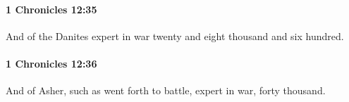 		\paragraph{1 Chronicles 12:35} %
			\label{1CHRONICLES-12-35}

			And of the Danites expert in war twenty and eight thousand and six hundred.


		\paragraph{1 Chronicles 12:36} %
			\label{1CHRONICLES-12-36}

			And of Asher, such as went forth to battle, expert in war, forty thousand.


